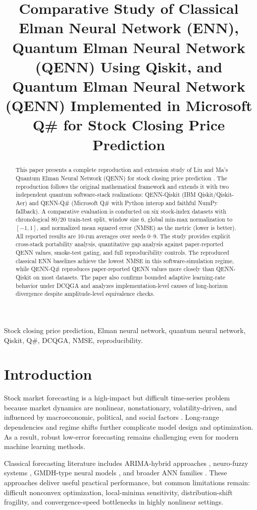 \documentclass[conference]{IEEEtran}
\title{Comparative Study of Classical Elman Neural Network (ENN), Quantum Elman Neural Network (QENN) Using Qiskit, and Quantum Elman Neural Network (QENN) Implemented in Microsoft Q\# for Stock Closing Price Prediction}
\author{
\IEEEauthorblockN{Reproduction and Extension Study}
\IEEEauthorblockA{Implementation stacks: PyTorch, Qiskit/Qiskit-Aer, Microsoft Q\# (Python interop)}
}
\begin{document}
\maketitle

\begin{abstract}
This paper presents a complete reproduction and extension study of Liu and Ma's Quantum Elman Neural Network (QENN) for stock closing price prediction \cite{ref43}. The reproduction follows the original mathematical framework and extends it with two independent quantum software-stack realizations: QENN-Qiskit (IBM Qiskit/Qiskit-Aer) and QENN-Q\# (Microsoft Q\# with Python interop and faithful NumPy fallback). A comparative evaluation is conducted on six stock-index datasets with chronological 80/20 train-test split, window size 6, global min-max normalization to $[-1,1]$, and normalized mean squared error (NMSE) as the metric (lower is better). All reported results are 10-run averages over seeds 0--9. The study provides explicit cross-stack portability analysis, quantitative gap analysis against paper-reported QENN values, smoke-test gating, and full reproducibility controls. The reproduced classical ENN baselines achieve the lowest NMSE in this software-simulation regime, while QENN-Q\# reproduces paper-reported QENN values more closely than QENN-Qiskit on most datasets. The paper also confirms bounded adaptive learning-rate behavior under DCQGA and analyzes implementation-level causes of long-horizon divergence despite amplitude-level equivalence checks.
\end{abstract}

\begin{IEEEkeywords}
Stock closing price prediction, Elman neural network, quantum neural network, Qiskit, Q\#, DCQGA, NMSE, reproducibility.
\end{IEEEkeywords}

\section{Introduction}
Stock market forecasting is a high-impact but difficult time-series problem because market dynamics are nonlinear, nonstationary, volatility-driven, and influenced by macroeconomic, political, and social factors \cite{ref14,ref37,ref38}. Long-range dependencies and regime shifts further complicate model design and optimization. As a result, robust low-error forecasting remains challenging even for modern machine learning methods.

Classical forecasting literature includes ARIMA-hybrid approaches \cite{ref2,ref37}, neuro-fuzzy systems \cite{ref1,ref4,ref8}, GMDH-type neural models \cite{ref22,ref23,ref24,ref30}, and broader ANN families \cite{ref10,ref12,ref25}. These approaches deliver useful practical performance, but common limitations remain: difficult nonconvex optimization, local-minima sensitivity, distribution-shift fragility, and convergence-speed bottlenecks in highly nonlinear settings.
\end{document}
